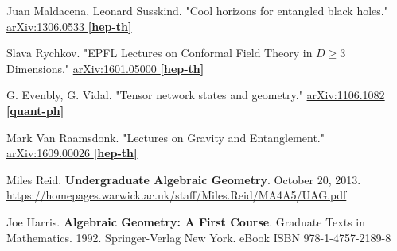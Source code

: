 \documentclass[10pt]{amsart}
\begin{document}
\begin{thebibliography}{9}
Juan Maldacena, Leonard Susskind.  "Cool horizons for entangled black holes."  \href{https://arxiv.org/abs/1306.0533}{ 	arXiv:1306.0533 \textbf{[hep-th]}}

Slava Rychkov.  "EPFL Lectures on Conformal Field Theory in $D \geq 3$ Dimensions."    \href{https://arxiv.org/abs/1601.05000}{arXiv:1601.05000 \textbf{[hep-th]}}

G. Evenbly, G. Vidal.  "Tensor network states and geometry."  \href{https://arxiv.org/abs/1106.1082}{arXiv:1106.1082 \textbf{[quant-ph]}}

Mark Van Raamsdonk.  "Lectures on Gravity and Entanglement."  \href{https://arxiv.org/abs/1609.00026}{arXiv:1609.00026 \textbf{[hep-th]}}


Miles Reid. \textbf{Undergraduate Algebraic Geometry}. October 20, 2013. \url{https://homepages.warwick.ac.uk/staff/Miles.Reid/MA4A5/UAG.pdf}

Joe Harris. \textbf{Algebraic Geometry: A First Course}. Graduate Texts in Mathematics. 1992. Springer-Verlag New York.   eBook ISBN 978-1-4757-2189-8
    




\end{thebibliography}
\end{document}
